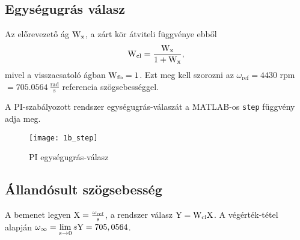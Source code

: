 
\subsection{Egységugrás válasz}

Az előrevezető ág $\mathrm{W}_\text{x}$, a zárt kör átviteli függvénye ebből
\begin{equation}
	\mathrm{W}_\text{cl} = \frac{\mathrm{W}_\text{x}}{1+\mathrm{W}_\text{x}},
\end{equation}
mivel a visszacsatoló ágban $\mathrm{W}_\text{fb}=1$.
Ezt meg kell szorozni az $\omega_\text{ref} = 4430$ rpm $ = 705.0564~\frac{\text{rad}}{\text{s}} $ referencia szögsebességgel.

A PI-szabályozott rendszer egységugrás-válaszát a MATLAB-os \verb|step| függvény adja meg.
\begin{figure}[H]
	\centering
	\texttt{[image: 1b\_step]}
	\caption{PI egységugrás-válasz}
	\label{fig:1b_step}
\end{figure}


\subsection{Állandósult szögsebesség}

A bemenet legyen $\mathrm{X} = \frac{\omega_\text{ref}}{s}$, a rendszer válasz $\mathrm{Y} = \mathrm{W}_\text{cl}\mathrm{X}$.
A végérték-tétel alapján $\omega_\infty = \lim\limits_{s\rightarrow 0}s\mathrm{Y} = 705,0564$.

